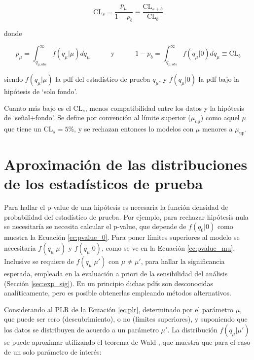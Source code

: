 \begin{equation}
	\text{CL}_{s} = \frac{p_{\mu}}{1-p_{b}} \equiv \frac{\text{CL}_{s+b}}{\text{CL}_{b}}
\end{equation}


\noindent 
donde

\begin{equation}
	p_{\mu} = \int_{q_{\mu, \text{obs}}}^{\infty} f(q_\mu|\mu)dq_\mu \quad\quad\quad \text{y} \quad\quad\quad 1-p_b = \int_{q_{\mu, obs}}^{\infty} f(q_\mu|0)dq_\mu \equiv \text{CL}_{b}
	\label{ec:pvalue_mu}
\end{equation}

\noindent
siendo $f(q_\mu|\mu)$ la pdf del estadístico de prueba $q_\mu$, y $f(q_\mu|0)$ la pdf bajo la hipótesis de `solo fondo'.

Cuanto más bajo es el $\text{CL}_{s}$, menos compatibilidad entre los datos y la hipótesis de `señal+fondo'. Se define por convención al límite superior ($\mu_{\text{up}}$) como aquel $\mu$ que tiene un $\text{CL}_{s}=5\%$, y se rechazan entonces lo modelos con $\mu$ menores a $\mu_{\text{up}}$.




\section{Aproximación de las distribuciones de los estadísticos de prueba}\label{sec:aprox_test}

Para hallar el p-value de una hipótesis es necesaria la función densidad de probabilidad del estadístico de prueba. Por ejemplo, para rechazar hipótesis nula se necesitaría se necesita calcular el p-value, que depende de $f(q_{0}|0)$ como muestra la Ecuación \ref{ec:pvalue_0}. Para poner límites superiores al modelo se necesitaría $f(q_{\mu}|\mu)$ y $f(q_{\mu}|0)$, como se ve en la Ecuación \ref{ec:pvalue_mu}. Inclusive se requiere de $f(q_{\mu}|\mu')$ con $\mu\neq\mu'$, para hallar la significancia esperada, empleada en la evaluación a priori de la sensibilidad del análisis (Sección \ref{sec:exp_sig}). En un principio dichas pdfs son desconocidas analíticamente, pero es posible obtenerlas empleando métodos alternativos.

Considerando al PLR de la Ecuación \ref{ec:plr}, determinado por el parámetro $\mu$, que puede ser cero (descubrimiento), o no (límites superiores), y suponiendo que los datos se distribuyen de acuerdo a un parámetro $\mu'$. La distribución $f(q_{\mu}|\mu')$ se puede aproximar utilizando el teorema de Wald \cite{10.2307/1990256}, que muestra que para el caso de un solo parámetro de interés:

